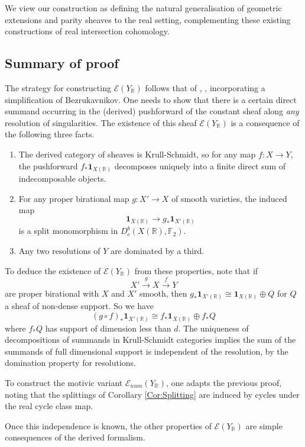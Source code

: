 \documentclass{amsart}
\theoremstyle{definition}
\theoremstyle{remark}
\begin{document}
We view our construction as defining the natural generalisation of geometric extensions and parity sheaves to the real setting, complementing these existing constructions of real intersection cohomology.
\subsection{Summary of proof}

The strategy for constructing $\mathscr{E}(Y_\mathbb{R})$ follows that of \cite{HoneWilliamson2025}, \cite{Mcnamara}, incorporating a simplification of Bezrukavnikov. One needs to show that there is a certain direct summand occurring in the (derived) pushforward of the constant sheaf along \emph{any} resolution of singularities. The existence of this sheaf $\mathscr{E}(Y_\mathbb{R})$ is a consequence of the following three facts.

\begin{enumerate}
    \item The derived category of sheaves is Krull-Schmidt, so for any map $f:X\to Y$, the pushforward $f_*\mathbf{1}_{X(\mathbb{R})}$ decomposes uniquely into a finite direct sum of indecomposable objects.
    \item For any proper birational map $g:X'\to X$ of smooth varieties, the induced map \[\mathbf{1}_{X(\mathbb{R})}\to g_*\mathbf{1}_{X'(\mathbb{R})}\] is a split monomorphism in $D^b_c(X(\mathbb{R}),\mathbb{F}_2)$.
    \item Any two resolutions of $Y$ are dominated by a third.
\end{enumerate}
To deduce the existence of $\mathscr{E}(Y_\mathbb{R})$ from these properties, note that if \[X'\xrightarrow{g} X\xrightarrow{f} Y\] are proper birational with $X$ and $X'$ smooth, then $g_*\mathbf{1}_{X'(\mathbb{R})}\cong \mathbf{1}_{X(\mathbb{R})}\oplus Q$ for $Q$ a sheaf of non-dense support. So we have \[(g\circ f)_*\mathbf{1}_{X'(\mathbb{R})}\cong f_*\mathbf{1}_{X(\mathbb{R})}\oplus f_*Q\] where $f_*Q$ has support of dimension less than $d$. The uniqueness of decompositions of summands in Krull-Schmidt categories implies the sum of the summands of full dimensional support is independent of the resolution, by the domination property for resolutions.

To construct the motivic variant $\mathscr{E}_{num}(Y_\mathbb{R})$, one adapts the previous proof, noting that the splittings of Corollary \ref{Cor:Splitting} are induced by cycles under the real cycle class map.

Once this independence is known, the other properties of $\mathscr{E}(Y_\mathbb{R})$ are simple consequences of the derived formalism.
\end{document}
